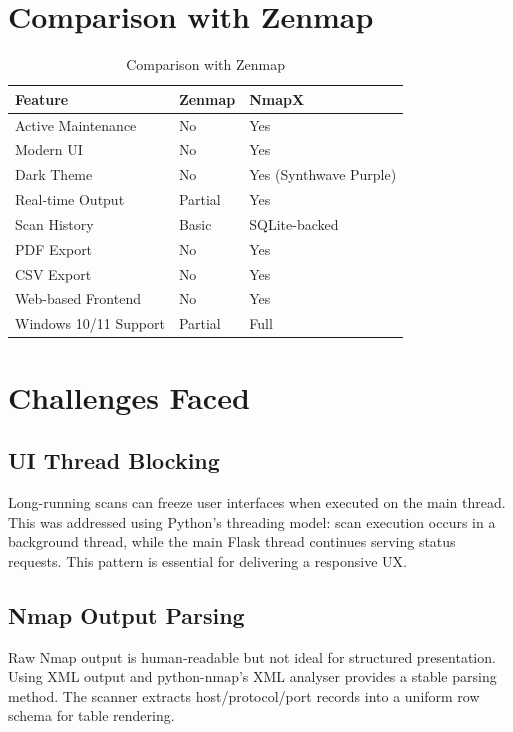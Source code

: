 \documentclass[12pt, a4paper]{report}
\begin{document}
\section{Comparison with Zenmap}
\begin{table}[H]
  \centering
  \caption{Comparison with Zenmap}
  \label{tab:zenmap-compare}
  \begin{tabularx}{\textwidth}{@{}X X X@{}}
    \toprule
    \textbf{Feature} & \textbf{Zenmap} & \textbf{NmapX} \\
    \midrule
    Active Maintenance & No & Yes \\
    Modern UI & No & Yes \\
    Dark Theme & No & Yes (Synthwave Purple) \\
    Real-time Output & Partial & Yes \\
    Scan History & Basic & SQLite-backed \\
    PDF Export & No & Yes \\
    CSV Export & No & Yes \\
    Web-based Frontend & No & Yes \\
    Windows 10/11 Support & Partial & Full \\
    \bottomrule
  \end{tabularx}
\end{table}

\section{Challenges Faced}
\subsection{UI Thread Blocking}
Long-running scans can freeze user interfaces when executed on the main thread. This was addressed using Python's threading model: scan execution occurs in a background thread, while the main Flask thread continues serving status requests. This pattern is essential for delivering a responsive UX.

\subsection{Nmap Output Parsing}
Raw Nmap output is human-readable but not ideal for structured presentation. Using XML output and python-nmap's XML analyser provides a stable parsing method. The scanner extracts host/protocol/port records into a uniform row schema for table rendering.
\end{document}
